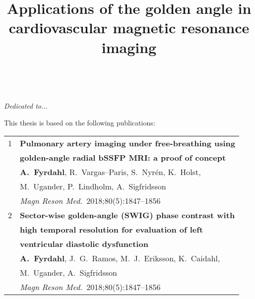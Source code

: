 \documentclass[11pt]{book}
\title{Applications of the golden angle in cardiovascular magnetic resonance imaging}
\begin{document}
\thispagestyle{empty} %

\newpage
\thispagestyle{empty} %
~
\vspace{140pt}
\begin{flushright}
\textit{Dedicated to...}
\end{flushright}
\cleardoublepage

\setcounter{page}{1} %
\setcounter{tocdepth}{1}
\tableofcontents
\newpage
{}
This thesis is based on the following publications:
\vspace{6mm}

\begin{tabular}{ll}
1   & \textbf{Pulmonary artery imaging under free-breathing using}\\
    & \textbf{golden-angle radial bSSFP MRI: a proof of concept}\\[2mm]
    & \textbf{A.~Fyrdahl}, R.~Vargas–Paris, S.~Nyrén, K.~Holst,\\
    & M.~Ugander, P.~Lindholm, A.~Sigfridsson \\
    & \textit{Magn Reson Med.}~2018;80(5):1847–1856\\[6mm]
2   & \textbf{Sector-wise golden-angle (SWIG) phase contrast with}\\
    & \textbf{high temporal resolution for evaluation of left}\\
    & \textbf{ventricular diastolic dysfunction}\\[2mm]
    & \textbf{A.~Fyrdahl}, J.~G.~Ramos, M.~J.~Eriksson, K.~Caidahl,\\
    & M.~Ugander, A.~Sigfridsson \\
    & \textit{Magn Reson Med.}~2018;80(5):1847–1856\\[6mm]
\end{tabular}
\newpage
{}

\blindtext
\end{document}
